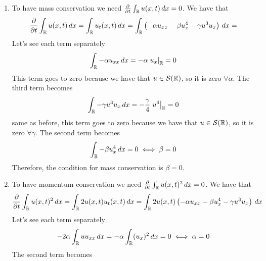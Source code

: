 \begin{enumerate}
    \item To have mass conservation we need \(\frac{\partial}{\partial t}\int_{\mathbb{R}}
          u(x,t) \, dx = 0\). We have that
          \[
              \begin{split}
                  \frac{\partial}{\partial t}\int_{\mathbb{R}} u(x,t) \, dx = \int_{\mathbb{R}} u_t(x,t) \, dx = \int_{\mathbb{R}} \left(- \alpha u_{xx} - \beta u_{x}^4 - \gamma u^3u_x\right) \, dx =
              \end{split}
          \]
          Let's see each term separately
          \[
              \begin{split}
                  \int_{\mathbb{R}} - \alpha u_{xx} \, dx = -\alpha \left.u_x\right|_{\mathbb{R}} = 0
              \end{split}
          \]
          This term goes to zero because we have that \(u \in \mathcal{S}(\mathbb{R})\), so it
          is zero \(\forall \alpha\). The third term becomes
          \[
              \begin{split}
                  \int_{\mathbb{R}} - \gamma u^3u_x \, dx = -\frac{\gamma}{4} \left. u^4 \right|_{\mathbb{R}} = 0
              \end{split}
          \]
          same as before, this term goes to zero because we have that \(u \in
          \mathcal{S}(\mathbb{R})\), so it is zero \(\forall \gamma\). The second term becomes
          \[
              \begin{split}
                  \int_{\mathbb{R}} - \beta u_{x}^4 \, dx = 0 \iff \beta = 0
              \end{split}
          \]
          Therefore, the condition for mass conservation is \(\beta = 0\).
    \item To have momentum conservation we need \(\frac{\partial}{\partial t}\int_{\mathbb{R}}
          u(x,t)^2 \, dx = 0\). We have that
          \[
              \begin{split}
                  \frac{\partial}{\partial t}\int_{\mathbb{R}} u(x,t)^2 \, dx = \int_{\mathbb{R}} 2u(x,t)u_t(x,t) \, dx = \int_{\mathbb{R}} 2u(x,t)\left(- \alpha u_{xx} - \beta u_{x}^4 - \gamma u^3u_x\right) \, dx
              \end{split}
          \]
          Let's see each term separately
          \[
              \begin{split}
                  -2\alpha \int_{\mathbb{R}} u u_{xx} \, dx = -\alpha \int_{\mathbb{R}} (u_x)^2 \, dx = 0 \iff \alpha = 0
              \end{split}
          \]
          The second term becomes

\end{enumerate}
